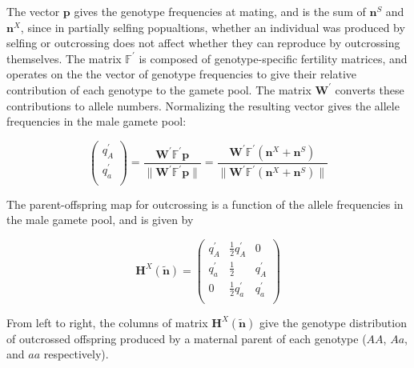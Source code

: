 \documentclass[11pt]{article}
\def\mbf#1{\mathbf{#1}}
\def\mbb#1{\mathbb{#1}}
\begin{document}
\noindent The vector $\mbf{p}$ gives the genotype frequencies at mating, and is the sum of $\mbf{n}^{S}$ and $\mbf{n}^{X}$, since in partially selfing popualtions, whether an individual was produced by selfing or outcrossing does not affect whether they can reproduce by outcrossing themselves. The matrix $\mbb{F}^{\prime}$ is composed of genotype-specific fertility matrices, and operates on the the vector of genotype frequencies to give their relative contribution of each genotype to the gamete pool. The matrix $\mbf{W}^{\prime}$ converts these contributions to allele numbers. Normalizing the resulting vector gives the allele frequencies in the male gamete pool:
\begin{linenomath*}
\begin{equation} \label{eq:maleGametePool}
	\left(
		\begin{array}{c}
			q^{\prime}_{A} \\
			q^{\prime}_{a} \\
		\end{array} \right) = 
			\frac{\mbf{W}^{\prime} \mbb{F}^{\prime} \mbf{p}}{\| \mbf{W}^{\prime} \mbb{F}^{\prime} \mbf{p} \|} = 
				\frac{\mbf{W}^{\prime} \mbb{F}^{\prime} (\mbf{n}^X + \mbf{n}^S)}{\| \mbf{W}^{\prime} \mbb{F}^{\prime} (\mbf{n}^X + \mbf{n}^S)\|}
\end{equation}
\end{linenomath*}

The parent-offspring map for outcrossing is a function of the allele frequencies in the male gamete pool, and is given by 
\begin{linenomath*}
\begin{equation} \label{eq:HX}
	\mbf{H}^X(\tilde{\mbf{n}}) = 
			\left(
			\begin{array}{ccc}
				q^{\prime}_{A} & \frac{1}{2} q^{\prime}_{A} & 0 \\
				q^{\prime}_{a} & \frac{1}{2} & q^{\prime}_{A}  \\
				0 & \frac{1}{2} q^{\prime}_{a} & q^{\prime}_{a} \\
			\end{array} \right)
\end{equation}
\end{linenomath*}

\noindent From left to right, the columns of matrix $\mbf{H}^X(\tilde{\mbf{n}})$ give the genotype distribution of outcrossed offspring produced by a maternal parent of each genotype ($AA$, $Aa$, and $aa$ respectively).
\end{document}
